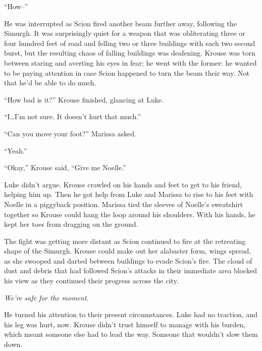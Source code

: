 ``How--''



He was interrupted as Scion fired another beam further away, following the Simurgh.  It was surprisingly quiet for a weapon that was obliterating three or four hundred feet of road and felling two or three buildings with each two second burst, but the resulting chaos of falling buildings was deafening.  Krouse was torn between staring and averting his eyes in fear; he went with the former: he wanted to be paying attention in case Scion happened to turn the beam their way.  Not that he'd be able to do much.



``How bad is it?'' Krouse finished, glancing at Luke.



``I\ldots I'm not sure.  It doesn't hurt that much.''



``Can you move your foot?''  Marissa asked.



``Yeah.''



``Okay,'' Krouse said, ``Give me Noelle.''



Luke didn't argue.  Krouse crawled on his hands and feet to get to his friend, helping him up.  Then he got help from Luke and Marissa to rise to his feet with Noelle in a piggyback position.  Marissa tied the sleeves of Noelle's sweatshirt together so Krouse could hang the loop around his shoulders.  With his hands, he kept her toes from dragging on the ground.



The fight was getting more distant as Scion continued to fire at the retreating shape of the Simurgh.  Krouse could make out her alabaster form, wings spread, as she swooped and darted between buildings to evade Scion's fire.  The cloud of dust and debris that had followed Scion's attacks in their immediate area blocked his view as they continued their progress across the city.



\emph{We're safe for the moment}.



He turned his attention to their present circumstances.  Luke had no traction, and his leg was hurt, now.  Krouse didn't trust himself to manage with his burden, which meant someone else had to lead the way.  Someone that wouldn't slow them down.



